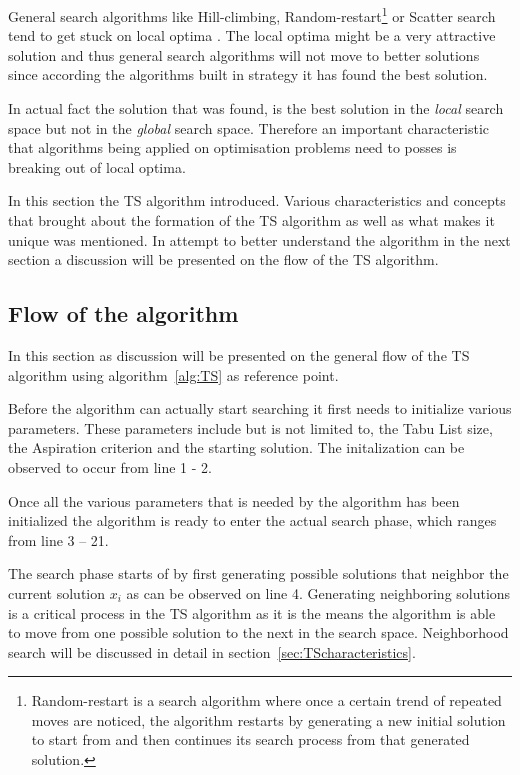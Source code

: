 General search algorithms like Hill-climbing, Random-restart\footnote{Random-restart is a search algorithm where once a certain trend of repeated moves are noticed, the algorithm restarts by generating a new initial solution to start from and then continues its search process from that generated solution\cite{AIModernApproach}.} or Scatter search tend to get stuck on local optima \cite{AIModernApproach}. The local optima might be a very attractive solution and thus general search algorithms will not move to better solutions since according the algorithms built in strategy it has found the best solution. 

In actual fact the solution that was found, is the best solution in the \emph{local} search space but not in the \emph{global} search space\cite{CompuIntelligenceIntro,AIModernApproach}. Therefore an important characteristic that algorithms being applied on optimisation problems need to posses is breaking out of local optima\cite{CompuIntelligenceIntro,AIModernApproach}.

In this section the TS algorithm introduced. Various characteristics and concepts that brought about the formation of the TS algorithm as well as what makes it unique was mentioned. In attempt to better understand the algorithm in the next section a discussion will be presented on the flow of the TS algorithm.
\subsection{Flow of the algorithm}
In this section as discussion will be presented on the general flow of the TS algorithm using algorithm~\ref{alg:TS} as reference point.

Before the algorithm can actually start searching it first needs to initialize various parameters. These parameters include but is not limited to, the Tabu List size, the Aspiration criterion and the starting solution. The initalization can be observed to occur from line 1 - 2.

Once all the various parameters that is needed by the algorithm has been initialized the algorithm is ready to enter the actual search phase, which ranges from line 3 -- 21. 

The search phase starts of by first generating possible solutions that neighbor the current solution $x_i$ as can be observed on line 4. Generating neighboring solutions is a critical process in the TS algorithm as it is the means the algorithm is able to move from one possible solution to the next in the search space. Neighborhood search will be discussed in detail in section~\ref{sec:TScharacteristics}.

